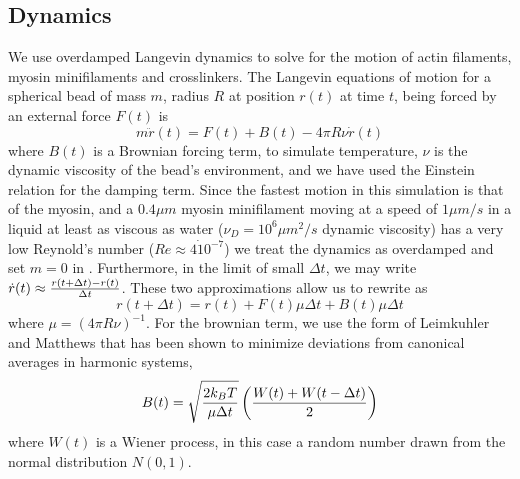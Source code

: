 \documentclass[12pt]{article}
\begin{document}
\subsection{Dynamics}
We use overdamped Langevin dynamics to solve for the motion of actin filaments, myosin minifilaments and crosslinkers.
The Langevin equations of motion for a spherical bead of
mass $m$, radius $R$ at position $r(t)$ at time $t$, being forced by an external force $F(t)$ is
\begin{equation}
  m\ddot{r}(t) = F(t) + B(t) - 4\pi R\nu \dot{r}(t)
  \label{eqn:lang}
\end{equation} 
where $B(t)$ is a Brownian forcing term, to simulate temperature, $\nu$ is the dynamic viscosity of the bead's
environment, and we have used the Einstein relation for the damping term.  
Since the fastest motion in this simulation is that of the myosin, and a $0.4\mu m$ myosin minifilament moving at
a speed of $1\mu m/s$ in a liquid at least as viscous as water ($\nu_D=10^6\mu m^2/s$ dynamic viscosity) has a very low Reynold's
number ($Re \approx 4\dot10^{-7}$) we treat the dynamics as overdamped and set $m=0$ in .
Furthermore, in the limit of small $\Delta t$, we may write $\dot{r}(t) \approx {r(t+\Delta t)-r(t)\over \Delta t}$. These two
approximations allow us to rewrite  as 
\begin{equation}  
  r(t+\Delta t) = r(t) + F(t)\mu \Delta t + B(t) \mu \Delta t
  \label{eqn:overdamped}
\end{equation}
where $\mu = (4\pi R\nu)^{-1}$. For the brownian term, we use the form of Leimkuhler and Matthews \cite{leimkuhler2013} that has
been shown to minimize deviations from canonical averages in harmonic systems,
\begin{equation}
  B(t)=\sqrt{2k_BT\over\mu \Delta t}\left({W(t)+W(t-\Delta t)\over2}\right)
  \label{eqn:baoab_brownian}
\end{equation} 
where $W(t)$ is a Wiener process, in this case a random number drawn from the normal distribution $N(0,1)$. 
\end{document}
